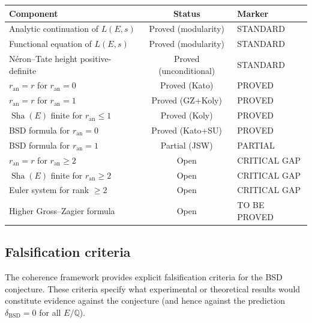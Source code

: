 \documentclass[11pt]{article}
\DeclareMathOperator{\Sha}{Sha}
\begin{document}
\begin{center}
\begin{tabular}{p{5.5cm}cl}
\hline
\textbf{Component} & \textbf{Status} & \textbf{Marker} \\
\hline
Analytic continuation of $L(E,s)$ & Proved (modularity) & STANDARD \\
Functional equation of $L(E,s)$ & Proved (modularity) & STANDARD \\
N\'eron--Tate height positive-definite & Proved (unconditional) & STANDARD \\
$r_{\mathrm{an}} = r$ for $r_{\mathrm{an}} = 0$ & Proved (Kato) & PROVED \\
$r_{\mathrm{an}} = r$ for $r_{\mathrm{an}} = 1$ & Proved (GZ+Koly) & PROVED \\
$\Sha(E)$ finite for $r_{\mathrm{an}} \leq 1$ & Proved (Koly) & PROVED \\
BSD formula for $r_{\mathrm{an}} = 0$ & Proved (Kato+SU) & PROVED \\
BSD formula for $r_{\mathrm{an}} = 1$ & Partial (JSW) & PARTIAL \\
$r_{\mathrm{an}} = r$ for $r_{\mathrm{an}} \geq 2$ & Open & CRITICAL GAP \\
$\Sha(E)$ finite for $r_{\mathrm{an}} \geq 2$ & Open & CRITICAL GAP \\
Euler system for rank $\geq 2$ & Open & CRITICAL GAP \\
Higher Gross--Zagier formula & Open & TO BE PROVED \\
\hline
\end{tabular}
\end{center}

\subsection{Falsification criteria}

The coherence framework provides explicit falsification criteria for the BSD
conjecture.  These criteria specify what experimental or theoretical results
would constitute evidence against the conjecture (and hence against the
prediction $\delta_{\mathrm{BSD}} = 0$ for all $E/\mathbb{Q}$).
\end{document}
